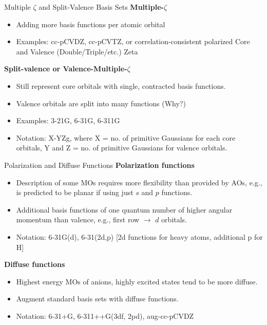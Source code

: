 \documentclass[aspectratio=169]{beamer}
\begin{document}
\begin{frame}{Multiple $\zeta$ and Split-Valence Basis Sets}
\textbf{Multiple-$\zeta$}
\begin{itemize}
    \item Adding more basis functions per atomic orbital
    \item Examples: cc-pCVDZ, cc-pCVTZ, or correlation-consistent polarized Core and Valence (Double/Triple/etc.) Zeta
\end{itemize}

\textbf{Split-valence or Valence-Multiple-$\zeta$}
\begin{itemize}
    \item Still represent core orbitals with single, contracted basis functions. 
    \item Valence orbitals are split into many functions (Why?)
    \item Examples: 3-21G, 6-31G, 6-311G
    \item Notation: X-YZg, where X = no. of primitive Gaussians for each core orbitals, Y and Z = no. of primitive Gaussians for valence orbitals. 
\end{itemize}

\end{frame}

\begin{frame}{Polarization and Diffuse Functions}
    \textbf{Polarization functions}
    \begin{itemize}
        \item Description of some MOs requires more flexibility than provided by AOs, e.g.,  is predicted to be planar if using just $s$ and $p$ functions.
        \item Additional basis functions of one quantum number of higher angular momentum than valence, e.g., first row $\rightarrow$ $d$ orbitals.
        \item Notation: 6-31G(d), 6-31(2d,p) [2d functions for heavy atoms, additional p for H]
    \end{itemize}

\textbf{Diffuse functions}
\begin{itemize}
    \item Highest energy MOs of anions, highly excited states tend to be more diffuse.
    \item Augment standard basis sets with diffuse functions.
    \item Notation: 6-31+G, 6-311++G(3df, 2pd), aug-cc-pCVDZ
\end{itemize}

\end{frame}
\end{document}

